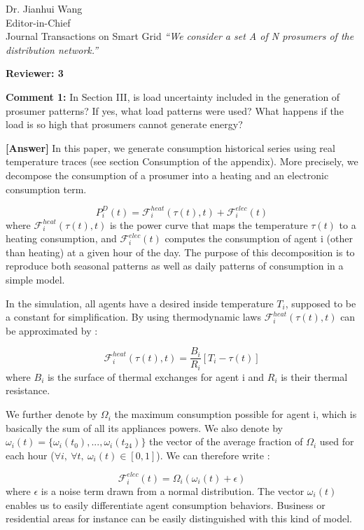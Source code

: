 \documentclass{letter}
\begin{document}
\begin{letter}{Dr. Jianhui Wang \\ Editor-in-Chief \\ Journal Transactions on Smart Grid }
\textit{“We consider a set A of N prosumers of the distribution network.”}


\textbf{Reviewer: 3}

\textbf{Comment 1:} In Section III, is load uncertainty included in the generation of prosumer patterns? If yes, what load patterns were used? What happens if the load is so high that prosumers cannot generate energy?


\textbf{[Answer]} In this paper, we generate consumption historical series using real temperature traces (see section Consumption of the appendix). More precisely, we decompose the consumption of a prosumer into a heating and an electronic consumption term.

\begin{equation}
P_{i}^{D}(t) = \mathcal{F}_{i}^{heat}(\tau(t), t) + \mathcal{F}_{i}^{elec}(t)
\end{equation}
where $ \mathcal{F}_{i}^{heat}(\tau(t), t) $ is the power curve that maps the temperature $ \tau(t) $ to a heating consumption, and $ \mathcal{F}_{i}^{elec}(t) $ computes the consumption of agent i (other than heating) at a given hour of the day. The purpose of this decomposition is to reproduce both seasonal patterns as well as daily patterns of consumption in a simple model.

In the simulation, all agents have a desired inside temperature $ T_{i} $, supposed to be a constant for simplification. By using thermodynamic laws $ \mathcal{F}_{i}^{heat}(\tau(t), t) $ can be approximated by :

\begin{equation}
\mathcal{F}_{i}^{heat}(\tau(t), t) = \frac{B_{i}}{R_{i}} \left[ T_{i} - \tau(t) \right]
\end{equation}
where $ B_{i} $ is the surface of thermal exchanges for agent i and $ R_{i} $ is their thermal resistance. 

We further denote by $ \Omega_{i} $ the maximum consumption possible for agent i, which is basically the sum of all its appliances powers. We also denote by $ \omega_{i}(t) = \{ \omega_{i}(t_{0}),...,\omega_{i}(t_{24}) \} $ the vector of the average fraction of $ \Omega_{i} $ used for each hour ($\forall i,\ \forall t,\ \omega_i(t) \in [0,1] $). We can therefore write :

\begin{equation}
\mathcal{F}_{i}^{elec}(t) = \Omega_{i} ( \omega_{i}(t) + \epsilon )
\end{equation}
where $ \epsilon $ is a noise term drawn from a normal distribution. The vector $ \omega_{i}(t) $ enables us to easily differentiate agent consumption behaviors. Business or residential areas for instance can be easily distinguished with this kind of model.


\end{letter}
\end{document}
